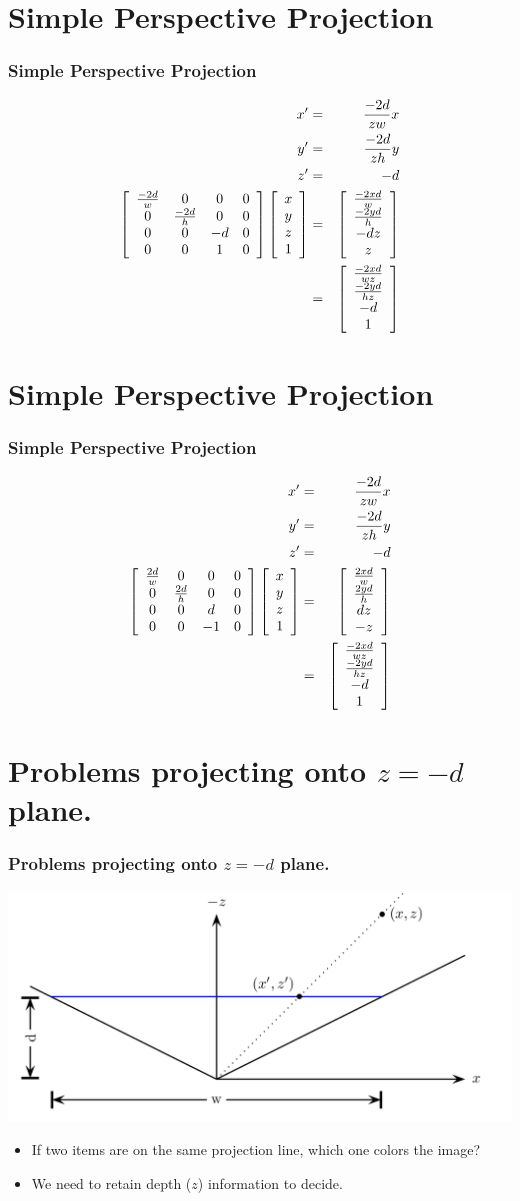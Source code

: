\documentclass[slidestop,xcolor=pst]{beamer}
\newcommand{\sect}[1]{
\section{#1}
\begin{frame}[fragile]\frametitle{#1}
}
\begin{document}
\sect{Simple Perspective Projection}
\begin{eqnarray*}
x' &=&  \frac{-2d}{zw}x\\
y' &=& \frac{-2d}{zh}y\\
z' &=&  -d\\
\left[\begin{array}{cccc} \frac{-2d}{w}&0&0&0 \\ 0&\frac{-2d}{h}&0&0 \\ 0&0&-d&0 \\ 0&0&1&0\end{array}\right] \left[\begin{array}{c} x\\y\\z \\ 1\end{array}\right]
  &=&\left[\begin{array}{c} \frac{-2xd}{w}\\\frac{-2yd}{h}\\-dz\\z \end{array}\right]\\
&=&\left[\begin{array}{c} \frac{-2xd}{wz}\\\frac{-2yd}{hz}\\-d \\ 1\end{array}\right]\\
\end{eqnarray*}
\end{frame}

\sect{Simple Perspective Projection}
\begin{eqnarray*}
x' &=&  \frac{-2d}{zw}x\\
y' &=& \frac{-2d}{zh}y\\
z' &=&  -d\\
\left[\begin{array}{cccc} \frac{2d}{w}&0&0&0 \\ 0&\frac{2d}{h}&0&0 \\ 0&0&d&0 \\ 0&0&-1&0\end{array}\right] \left[\begin{array}{c} x\\y\\z \\ 1\end{array}\right]
  &=&\left[\begin{array}{c} \frac{2xd}{w}\\\frac{2yd}{h}\\dz\\-z \end{array}\right]\\
&=&\left[\begin{array}{c} \frac{-2xd}{wz}\\\frac{-2yd}{hz}\\-d \\ 1\end{array}\right]\\
\end{eqnarray*}
\end{frame}

\sect{Problems projecting onto $z=-d$ plane.}
\includegraphics[width=1\textwidth]{perspective.png}
\begin{itemize}
\item If two items are on the same projection line, which one colors
  the image? 
\item We need to retain depth ($z$) information to decide.
\end{itemize}
\end{frame}
\end{document}
